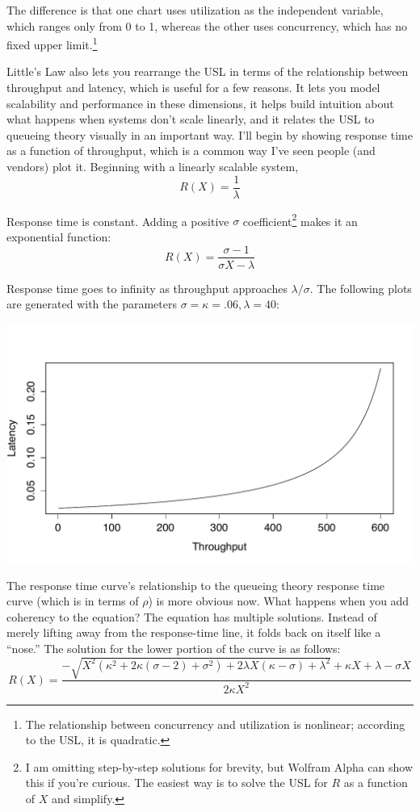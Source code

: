 \documentclass{vivid_layout}
\begin{document}
The difference is that one chart uses utilization as the independent variable,
which ranges only from 0 to 1, whereas the other uses concurrency, which has no
fixed upper limit.\footnote{The relationship between concurrency and utilization
is nonlinear; according to the USL, it is quadratic.}

Little's Law also lets you rearrange the USL in terms of the relationship
between throughput and latency, which is useful for a few reasons. It lets you
model scalability and performance in these dimensions, it helps build intuition
about what happens when systems don't scale linearly,  and it relates the USL to
queueing theory visually in an important way.
I'll begin by showing response time as a function of throughput, which is a
common way I've seen people (and vendors) plot it. Beginning with a linearly
scalable system,
\[
R(X) = \frac{1}{\lambda}
\]

Response time is constant. Adding a positive $\sigma$ coefficient\footnote{I am
omitting step-by-step solutions for brevity, but Wolfram Alpha can show this if
you're curious. The easiest way is to solve the USL for $R$ as a function of
$X$ and simplify.} makes it an exponential function:
\begin{equation}
R(X) = \frac{\sigma - 1}{\sigma X - \lambda}
\label{amdahl_r_x}
\end{equation}

Response time goes to infinity as throughput approaches $\lambda/\sigma$. The
following plots are generated with the parameters $\sigma=\kappa=.06,
\lambda=40$:
\begin{center}
\includegraphics[width=.85\linewidth]{scalability/r-function-x-amdahl}
\end{center}

The response time curve's relationship to the queueing theory response time
curve (which is in terms of $\rho$) is more obvious now. What happens when you
add coherency to the equation? The equation has multiple solutions.  Instead of
merely lifting away from the response-time line, it folds back on itself like a
``nose.'' The solution for the lower portion of the curve is as follows:
\begin{equation}
R(X)=\frac{-\sqrt{X^2(\kappa^2+2\kappa(\sigma-2) + \sigma^2)+2\lambda X(\kappa-\sigma)+\lambda^2}+\kappa X+\lambda-\sigma X}{2\kappa X^2}
\label{r_x_lower}
\end{equation}
\end{document}
